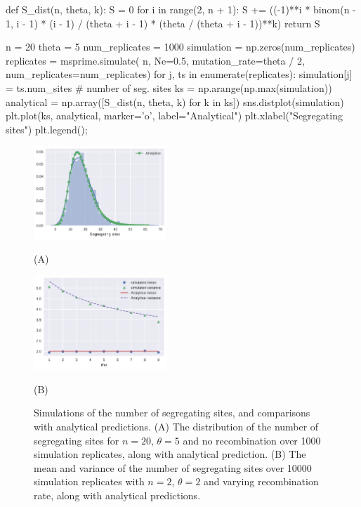 \documentclass[graybox]{svmult}
\begin{document}
\begin{pythoncode}
def S_dist(n, theta, k):
    S = 0
    for i in range(2, n + 1):
        S += ((-1)**i * binom(n - 1, i - 1)
              * (i - 1) / (theta + i - 1) * (theta / (theta + i - 1))**k)
    return S

n = 20
theta = 5
num_replicates = 1000
simulation = np.zeros(num_replicates)
replicates = msprime.simulate(
    n, Ne=0.5, mutation_rate=theta / 2, num_replicates=num_replicates)
for j, ts in enumerate(replicates):
    simulation[j] = ts.num_sites  # number of seg. sites
ks = np.arange(np.max(simulation))
analytical = np.array([S_dist(n, theta, k) for k in ks])
sns.distplot(simulation)
plt.plot(ks, analytical, marker='o', label="Analytical")
plt.xlabel("Segregating sites")
plt.legend();
\end{pythoncode}

\begin{figure}
\begin{center}
    \parbox{5cm}{
    \includegraphics[width=5cm]{images/segsites-example_9_0.pdf}
    \begin{center}(A)\end{center}
    }%
    \qquad
    \parbox{5cm}{
    \includegraphics[width=5cm]{images/segsites-example_12_0.pdf}
    \begin{center}(B)\end{center}
    }
    \caption{Simulations of the number of segregating sites, and
    comparisons with analytical predictions.
    (A) The distribution of the number
    of segregating sites for $n=20$, $\theta=5$ and no recombination
    over 1000 simulation replicates, along with analytical prediction.
    (B) The mean and variance of the number of segregating sites
    over 10000 simulation replicates with $n=2$, $\theta=2$ and
    varying recombination rate, along with analytical predictions.}
    \label{fig:segsites}
\end{center}
\end{figure}
\end{document}
